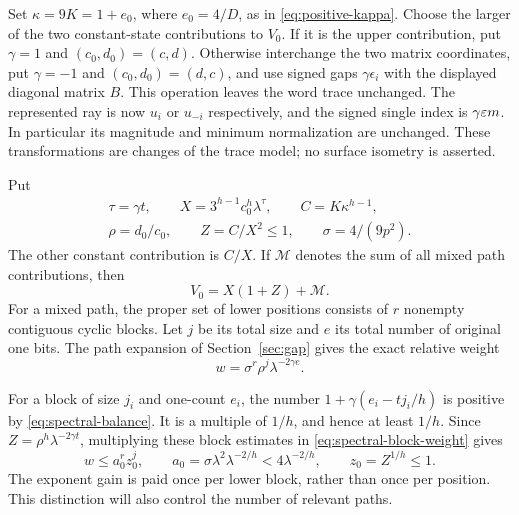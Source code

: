 Set $\kappa=9K=1+e_0$, where $e_0=4/D$, as in
\eqref{eq:positive-kappa}. Choose the larger of the two constant-state
contributions to $V_0$. If it is the upper contribution, put $\gamma=1$
and $(c_0,d_0)=(c,d)$. Otherwise interchange the two matrix coordinates,
put $\gamma=-1$ and $(c_0,d_0)=(d,c)$, and use signed gaps
$\gamma\epsilon_i$ with the displayed diagonal matrix $B$.
This operation leaves the word trace unchanged. The represented ray
is now $u_i$ or $u_{-i}$ respectively, and the signed single index is
$\gamma\varepsilon m$. In particular its magnitude and minimum normalization
are unchanged. These transformations are changes of the trace model;
no surface isometry is asserted.

Put
\begin{equation}\label{eq:spectral-dominant-data}
 \begin{gathered}
 \tau=\gamma t,\qquad
 X=3^{h-1}c_0^h\lambda^\tau,\qquad
 C=K\kappa^{h-1},\\
 \rho=d_0/c_0,\qquad Z=C/X^2\leqslant1,
 \qquad \sigma=4/(9p^2).
 \end{gathered}
\end{equation}
The other constant contribution is $C/X$. If $\mathcal M$ denotes
the sum of all mixed path contributions, then
\begin{equation}\label{eq:spectral-trace-split}
 V_0=X(1+Z)+\mathcal M.
\end{equation}
For a mixed path, the proper set of lower positions consists of $r$
nonempty contiguous cyclic blocks. Let $j$ be its total size and $e$
its total number of original one bits. The path expansion of
Section~\ref{sec:gap} gives the exact relative weight
\begin{equation}\label{eq:spectral-block-weight}
 w=\sigma^r\rho^j\lambda^{-2\gamma e}.
\end{equation}

For a block of size $j_i$ and one-count $e_i$, the number
$1+\gamma(e_i-tj_i/h)$ is positive by
\eqref{eq:spectral-balance}. It is a multiple of $1/h$, and hence
at least $1/h$. Since
$Z=\rho^h\lambda^{-2\gamma t}$, multiplying these block estimates
in \eqref{eq:spectral-block-weight} gives
\begin{equation}\label{eq:spectral-coarse-block-weight}
 w\leqslant a_0^r z_0^j,
 \qquad a_0=\sigma\lambda^2\lambda^{-2/h}<4\lambda^{-2/h},
 \qquad z_0=Z^{1/h}\leqslant1.
\end{equation}
The exponent gain is paid once per lower block, rather than once per
position. This distinction will also control the number of relevant paths.

